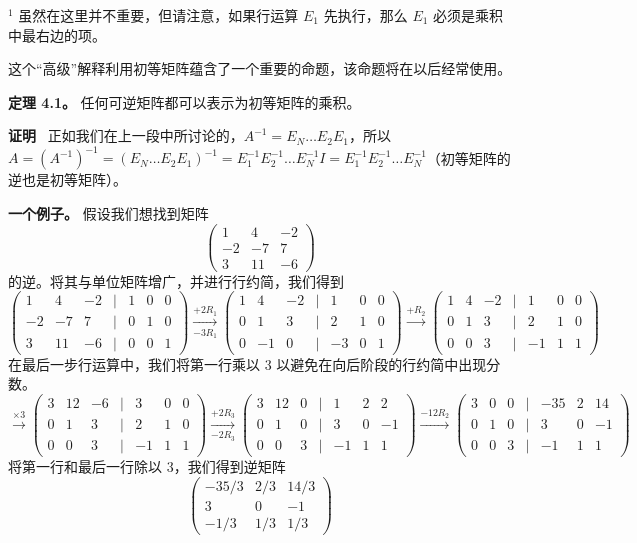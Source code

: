 $^1$ 虽然在这里并不重要，但请注意，如果行运算 $E_1$ 先执行，那么 $E_1$ 必须是乘积中最右边的项。

这个“高级”解释利用初等矩阵蕴含了一个重要的命题，该命题将在以后经常使用。

\textbf{定理 4.1。} 任何可逆矩阵都可以表示为初等矩阵的乘积。

\textbf{证明}~ 正如我们在上一段中所讨论的，$A^{-1} = E_N \dots E_2 E_1$，所以 $A = (A^{-1})^{-1} = (E_N \dots E_2 E_1)^{-1} = E_1^{-1} E_2^{-1} \dots E_N^{-1} I = E_1^{-1} E_2^{-1} \dots E_N^{-1}$（初等矩阵的逆也是初等矩阵）。

\textbf{一个例子。} 假设我们想找到矩阵
$$
\begin{pmatrix} 1 & 4 & -2 \\ -2 & -7 & 7 \\ 3 & 11 & -6 \end{pmatrix}
$$
的逆。将其与单位矩阵增广，并进行行约简，我们得到
$$
\begin{pmatrix} 1 & 4 & -2 & | & 1 & 0 & 0 \\ -2 & -7 & 7 & | & 0 & 1 & 0 \\ 3 & 11 & -6 & | & 0 & 0 & 1 \end{pmatrix} \xrightarrow[{-3R_1}]{+2R_1} \begin{pmatrix} 1 & 4 & -2 & | & 1 & 0 & 0 \\ 0 & 1 & 3 & | & 2 & 1 & 0 \\ 0 & -1 & 0 & | & -3 & 0 & 1 \end{pmatrix} \xrightarrow{+R_2} \begin{pmatrix} 1 & 4 & -2 & | & 1 & 0 & 0 \\ 0 & 1 & 3 & | & 2 & 1 & 0 \\ 0 & 0 & 3 & | & -1 & 1 & 1 \end{pmatrix}
$$
在最后一步行运算中，我们将第一行乘以 3 以避免在向后阶段的行约简中出现分数。
$$
\xrightarrow{\times 3} \begin{pmatrix} 3 & 12 & -6 & | & 3 & 0 & 0 \\ 0 & 1 & 3 & | & 2 & 1 & 0 \\ 0 & 0 & 3 & | & -1 & 1 & 1 \end{pmatrix} \xrightarrow[-2R_3]{+2R_3} \begin{pmatrix} 3 & 12 & 0 & | & 1 & 2 & 2 \\ 0 & 1 & 0 & | & 3 & 0 & -1 \\ 0 & 0 & 3 & | & -1 & 1 & 1 \end{pmatrix} \xrightarrow{-12R_2} \begin{pmatrix} 3 & 0 & 0 & | & -35 & 2 & 14 \\ 0 & 1 & 0 & | & 3 & 0 & -1 \\ 0 & 0 & 3 & | & -1 & 1 & 1 \end{pmatrix}
$$
将第一行和最后一行除以 3，我们得到逆矩阵
$$
\begin{pmatrix} -35/3 & 2/3 & 14/3 \\ 3 & 0 & -1 \\ -1/3 & 1/3 & 1/3 \end{pmatrix}
$$

